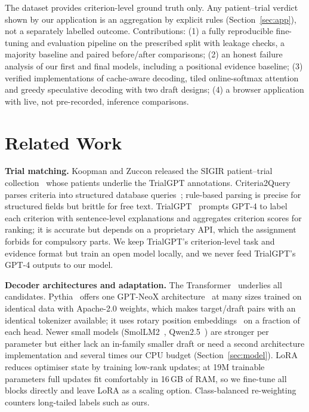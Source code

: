 The dataset provides criterion-level ground truth only. Any patient--trial verdict shown by our application is an aggregation by explicit rules (Section~\ref{sec:app}), not a separately labelled outcome. Contributions: (1) a fully reproducible fine-tuning and evaluation pipeline on the prescribed split with leakage checks, a majority baseline and paired before/after comparisons; (2) an honest failure analysis of our first and final models, including a positional evidence baseline; (3) verified implementations of cache-aware decoding, tiled online-softmax attention and greedy speculative decoding with two draft designs; (4) a browser application with live, not pre-recorded, inference comparisons.

\section{Related Work}
\textbf{Trial matching.} Koopman and Zuccon released the SIGIR patient--trial collection~\cite{sigir} whose patients underlie the TrialGPT annotations. Criteria2Query parses criteria into structured database queries~\cite{c2q}; rule-based parsing is precise for structured fields but brittle for free text. TrialGPT~\cite{trial} prompts GPT-4 to label each criterion with sentence-level explanations and aggregates criterion scores for ranking; it is accurate but depends on a proprietary API, which the assignment forbids for compulsory parts. We keep TrialGPT's criterion-level task and evidence format but train an open model locally, and we never feed TrialGPT's GPT-4 outputs to our model.

\textbf{Decoder architectures and adaptation.} The Transformer~\cite{attention} underlies all candidates. Pythia~\cite{pythia} offers one GPT-NeoX architecture~\cite{neox} at many sizes trained on identical data with Apache-2.0 weights, which makes target/draft pairs with an identical tokenizer available; it uses rotary position embeddings~\cite{rope} on a fraction of each head. Newer small models (SmolLM2~\cite{smollm2}, Qwen2.5~\cite{qwen}) are stronger per parameter but either lack an in-family smaller draft or need a second architecture implementation and several times our CPU budget (Section~\ref{sec:model}). LoRA~\cite{lora} reduces optimiser state by training low-rank updates; at 19M trainable parameters full updates fit comfortably in 16\,GB of RAM, so we fine-tune all blocks directly and leave LoRA as a scaling option. Class-balanced re-weighting~\cite{classbal} counters long-tailed labels such as ours.

